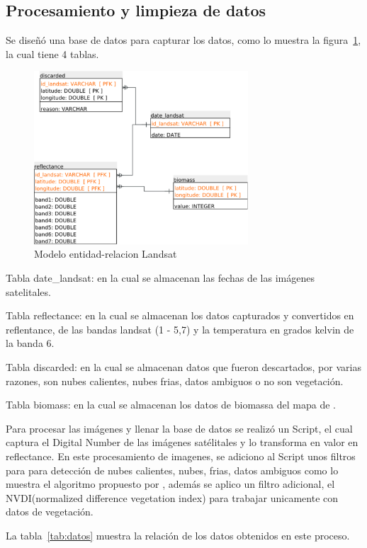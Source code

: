 \subsection{Procesamiento y limpieza de datos}

Se diseñó una base de datos para capturar los datos,
como lo muestra la figura~\ref{fig:landsatET}, la cual tiene 4 tablas. 

\begin{figure}
  \centering
  \includegraphics[width = 8cm]{landsatET.pdf}
  \caption{Modelo entidad-relacion Landsat}
  \label{fig:landsatET}
\end{figure}

Tabla date\_landsat: en la cual se almacenan las fechas de las imágenes satelitales.

Tabla reflectance: en la cual se almacenan los datos capturados y convertidos en reflentance,
de las bandas landsat (1 - 5,7) y la temperatura en grados kelvin de la banda 6.

Tabla discarded: en la cual se almacenan datos que fueron descartados, por varias razones,
son nubes calientes, nubes frias, datos ambiguos o no son vegetación.

Tabla biomass: en la cual se almacenan los datos de biomassa del mapa de \cite{baccini2008afirst}.

Para procesar las imágenes y llenar la base de datos se realizó un Script, el cual captura el Digital Number
de las imágenes satélitales y lo transforma en valor en reflectance. En este procesamiento de imagenes, se adiciono al Script unos filtros para para detección de nubes calientes,
nubes, frias, datos ambiguos como lo muestra el algoritmo propuesto por \cite{irish2000landsat}, además se aplico 
un filtro adicional, el NVDI(normalized difference vegetation index) para trabajar unicamente con datos de vegetación.

La tabla~\ref{tab:datos} muestra la relación de los datos obtenidos en este proceso.

